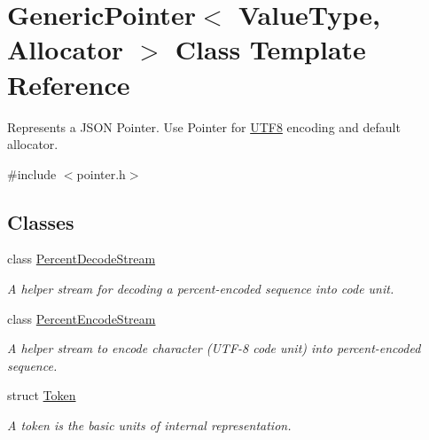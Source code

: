 \hypertarget{class_generic_pointer}{}\section{Generic\+Pointer$<$ Value\+Type, Allocator $>$ Class Template Reference}
\label{class_generic_pointer}


Represents a J\+S\+ON Pointer. Use Pointer for \hyperlink{struct_u_t_f8}{U\+T\+F8} encoding and default allocator.  




{\ttfamily \#include $<$pointer.\+h$>$}

\subsection*{Classes}
\begin{DoxyCompactItemize}
\item 
class \hyperlink{class_generic_pointer_1_1_percent_decode_stream}{Percent\+Decode\+Stream}
\begin{DoxyCompactList}\small\item\em A helper stream for decoding a percent-\/encoded sequence into code unit. \end{DoxyCompactList}\item 
class \hyperlink{class_generic_pointer_1_1_percent_encode_stream}{Percent\+Encode\+Stream}
\begin{DoxyCompactList}\small\item\em A helper stream to encode character (U\+T\+F-\/8 code unit) into percent-\/encoded sequence. \end{DoxyCompactList}\item 
struct \hyperlink{struct_generic_pointer_1_1_token}{Token}
\begin{DoxyCompactList}\small\item\em A token is the basic units of internal representation. \end{DoxyCompactList}\end{DoxyCompactItemize}
